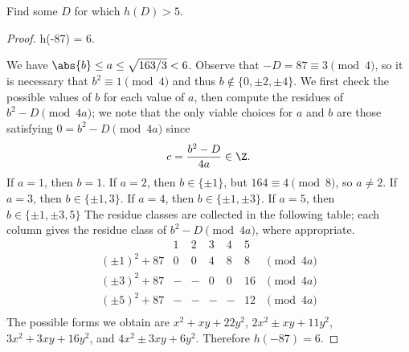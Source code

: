 \documentclass[10pt]{amsart}
\begin{document}
\begin{thm}
  Find some $D$ for which $h(D) > 5$.
  
  \begin{proof}
    h(-87) = 6.

    We have $\abs{b} \leq a \leq \sqrt{163/3} < 6$.
    Observe that $-D = 87 \equiv 3 \pmod{4}$, so it is necessary that $b^2 \equiv 1 \pmod{4}$ and thus $b \not \in \{0, \pm 2, \pm 4\}$.
    We first check the possible values of $b$ for each value of $a$, then compute the residues of $b^2 - D \pmod {4a}$; we note that the only viable choices for $a$ and $b$ are those satisfying $0 = b^2 - D \pmod{4a}$ since
    $$c = \frac{b^2 - D}{4a} \in \Z.$$
    If $a = 1$, then $b = 1$.
    If $a = 2$, then $b \in \{\pm 1\}$, but $164 \equiv 4 \pmod{8}$, so $a \neq 2$. 
    If $a = 3$, then $b \in \{\pm 1, 3\}$.
    If $a = 4$, then $b \in \{\pm 1, \pm 3\}$.
    If $a = 5$, then $b \in \{\pm 1, \pm 3, 5\}$
    The residue classes are collected in the following table; each column gives the residue class of $b^2 - D \pmod{4a}$, where appropriate.
    $$\begin{array}{c||cccccc}
      & 1 & 2 & 3 & 4 & 5\\
      \hline        
      (\pm 1)^2 + 87 & 0 & 0 & 4 & 8 & 8  & \pmod{4a}\\
      (\pm 3)^2 + 87 & - & - & 0 & 0 & 16 & \pmod{4a}\\
      (\pm 5)^2 + 87 & - & - & - & -  & 12  & \pmod{4a}\\
    \end{array}$$
    The possible forms we obtain are $x^2 + xy + 22y^2$, $2x^2 \pm xy + 11y^2$, $3x^2 + 3xy + 16y^2$, and $4x^2 \pm 3xy + 6y^2$.
    Therefore $h(-87) = 6$.
  \end{proof}
\end{thm}
\end{document}
